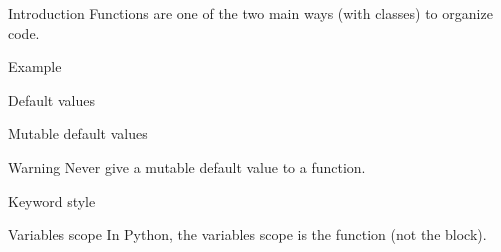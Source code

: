 \begin{frame}{Introduction}
  Functions are one of the two main ways (with classes) to organize code.
\end{frame}

\begin{frame}{Example}
\end{frame}

\begin{frame}{Default values}
\end{frame}

\begin{frame}{Mutable default values}
  \begin{alertblock}{Warning}
    Never give a mutable default value to a function.
  \end{alertblock}

\end{frame}

\begin{frame}{Keyword style}
\end{frame}

\begin{frame}{Variables scope}
  In Python, the variables scope is the function (not the block).

\end{frame}
